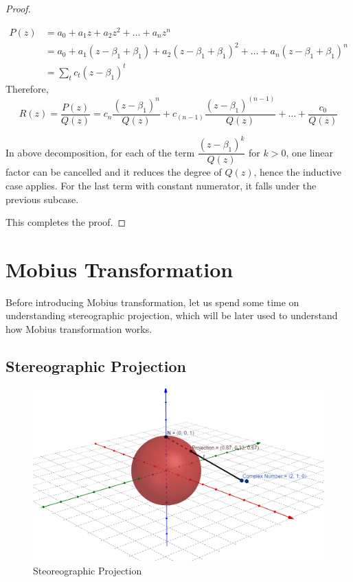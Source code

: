 \documentclass[12pt]{article}
\let\oldsection\section
\renewcommand\section{\clearpage\oldsection}
\theoremstyle{definition}
\begin{document}
\begin{proof}
\begin{enumerate}
        \begin{align*}
            P(z) & = a_0 + a_1 z + a_2 z^2 + \dots + a_n z^n\\
            & = a_0 + a_1 (z - \beta_1 + \beta_1) + a_2 (z - \beta_1 + \beta_1)^2 + \dots + a_n (z - \beta_1 + \beta_1)^n\\
            & = \sum_t c_t (z - \beta_1)^t
        \end{align*}
        Therefore,
        $$R(z) = \dfrac{P(z)}{Q(z)} = c_n \dfrac{(z - \beta_1)^n}{Q(z)} + c_{(n-1)} \dfrac{(z - \beta_1)^{(n-1)}}{Q(z)} + \dots + \dfrac{c_0}{Q(z)}$$
        
        In above decomposition, for each of the term $\dfrac{(z - \beta_1)^k}{Q(z)}$ for $k > 0$, one linear factor can be cancelled and it reduces the degree of $Q(z)$, hence the inductive case applies. For the last term with constant numerator, it falls under the previous subcase.
    \end{enumerate}
    
    This completes the proof.
\end{proof}


\section{Mobius Transformation}

Before introducing Mobius transformation, let us spend some time on understanding stereographic projection, which will be later used to understand how Mobius transformation works.

\subsection{Stereographic Projection}

\begin{figure}[ht]
    \centering
    \includegraphics[width = \textwidth]{complex-figures/stereographic-projection.png}
    \caption{Steoreographic Projection}
    \label{fig:stereographic-projection}
\end{figure}
\end{document}
